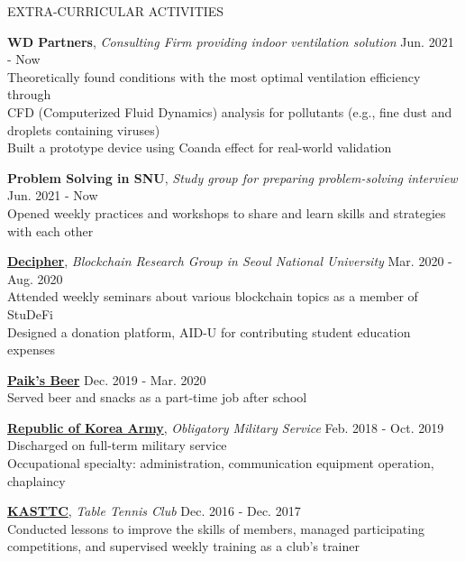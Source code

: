 \documentclass[10pt]{resume} %
\begin{document}

\begin{rSection}{EXTRA-CURRICULAR ACTIVITIES}
%

{\bf WD Partners}, \textit{Consulting Firm providing indoor ventilation solution} \hfill Jun. 2021 - Now\\
Theoretically found conditions with the most optimal ventilation efficiency through \\
CFD (Computerized Fluid Dynamics) analysis for pollutants (e.g., fine dust and droplets containing viruses) \\
Built a prototype device using Coanda effect for real-world validation 

{\bf Problem Solving in SNU}, \textit{Study group for preparing problem-solving interview} \hfill Jun. 2021 - Now \\
Opened weekly practices and workshops to share and learn skills and strategies with each other

{\bf \href{https://decipher.ac/}{Decipher}}, \textit{Blockchain Research Group in Seoul National University} \hfill Mar. 2020 - Aug. 2020\\
Attended weekly seminars about various blockchain topics as a member of StuDeFi \\
Designed a donation platform, AID-U for contributing student education expenses 

{\bf \href{http://paiksbeer.com/}{Paik’s Beer}} \hfill Dec. 2019 - Mar. 2020\\
Served beer and snacks as a part-time job after school \

{\bf \href{https://www.army.mil.kr/}{Republic of Korea Army}}, \textit{Obligatory Military Service} \hfill Feb. 2018 - Oct. 2019 \\
Discharged on full-term military service \\
Occupational specialty: administration, communication equipment operation, chaplaincy 

{\bf \href{http://kasttc.kr/}{KASTTC}}, \textit{Table Tennis Club} \hfill Dec. 2016 - Dec. 2017\\
Conducted lessons to improve the skills of members, managed participating competitions, and supervised weekly training as a club's trainer \

\end{rSection}


%
\end{document}
